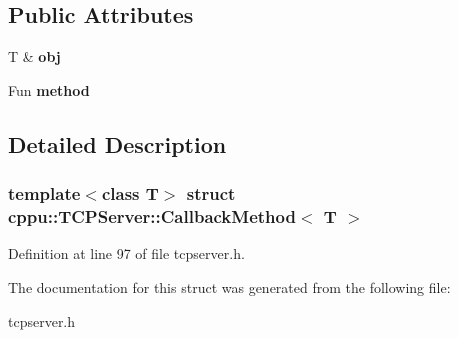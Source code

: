 \subsection*{Public Attributes}
\begin{DoxyCompactItemize}
\item 
\mbox{\label{structcppu_1_1_t_c_p_server_1_1_callback_method_ae480535d346efc119fb5c43880f349c8}} 
T \& {\bfseries obj}
\item 
\mbox{\label{structcppu_1_1_t_c_p_server_1_1_callback_method_aab858a039ddee71fb65a0e35c173f067}} 
Fun {\bfseries method}
\end{DoxyCompactItemize}


\subsection{Detailed Description}
\subsubsection*{template$<$class T$>$\newline
struct cppu\+::\+T\+C\+P\+Server\+::\+Callback\+Method$<$ T $>$}



Definition at line 97 of file tcpserver.\+h.



The documentation for this struct was generated from the following file\+:\begin{DoxyCompactItemize}
\item 
tcpserver.\+h\end{DoxyCompactItemize}
